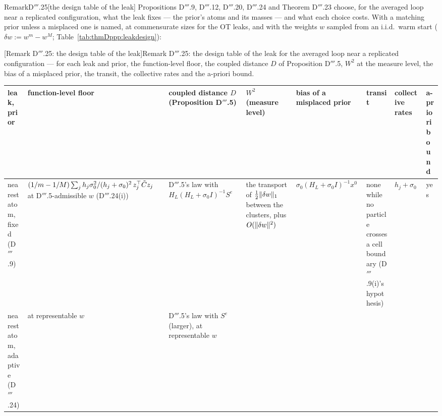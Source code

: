 \begin{rmk}{Remark}{D$'''$.25}[the design table of the leak]\label{res:thmDppp:25}%
Propositions D$'''$.9, D$'''$.12, D$'''$.20, D$'''$.24 and Theorem D$'''$.23 choose, for the averaged loop near a
replicated configuration, what the leak fixes --- the prior's atoms and its masses --- and what each choice costs.
With a matching prior unless a misplaced one is named, at commensurate sizes for the OT leaks, and with the weights $w$
sampled from an i.i.d.\ warm start ($\delta w := w^m - w^M$; Table~\ref{tab:thmDppp:leakdesign}):

\medskip
\noindent\begin{minipage}{\textwidth}
\centering\footnotesize
{}[Remark D$'''$.25: the design table of the leak]{Remark D$'''$.25: the design table of the leak for
the averaged loop near a replicated configuration --- for each leak and prior, the function-level floor, the coupled
distance $D$ of Proposition D$'''$.5, $W^2$ at the measure level, the bias of a misplaced prior, the transit, the
collective rates and the a-priori bound.}
\label{tab:thmDppp:leakdesign}
\setlength{\tabcolsep}{3pt}
\begin{tabularx}{\textwidth}{@{}>{\hsize=0.7\hsize\raggedright\arraybackslash}X>{\hsize=1.56\hsize\raggedright\arraybackslash}X>{\hsize=0.96\hsize\raggedright\arraybackslash}X>{\hsize=0.8\hsize\raggedright\arraybackslash}X>{\hsize=1.45\hsize\raggedright\arraybackslash}X>{\hsize=0.8\hsize\raggedright\arraybackslash}X>{\hsize=1.12\hsize\raggedright\arraybackslash}X>{\hsize=0.61\hsize\raggedright\arraybackslash}X@{}}
\toprule
leak, prior & function-level floor & coupled distance $D$ (Proposition D$'''$.5) & $W^2$ (measure level)
  & bias of a misplaced prior & transit & collective rates & a-priori bound\\
\midrule
nearest atom, fixed (D$'''$.9)
  & ${(1/m - 1/M)}\allowbreak\sum_jh_j\sigma_0^2/{(h_j + \sigma_0)^2}\allowbreak\,z_j^\top\tilde Cz_j$ at D$'''$.5-admissible $w$ (D$'''$.24(i))
  & D$'''$.5's law with $H_L(H_L + \sigma_0I)^{-1}S^e$
  & the transport of $\frac12\lVert \delta w\rVert_1$ between the clusters, plus $O(\lVert \delta w\rVert^2)$
  & $\sigma_0(H_L + \sigma_0I)^{-1}x^0$
  & none while no particle crosses a cell boundary (D$'''$.9(i)'s hypothesis)
  & $h_j + \sigma_0$
  & yes\\
nearest atom, adaptive (D$'''$.24)
  & 0 at representable $w$
  & D$'''$.5's law with $S^e$ (larger), at representable $w$

\end{tabularx}
\end{minipage}
\end{rmk}

